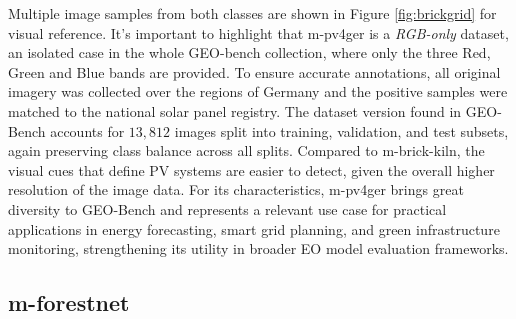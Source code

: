 \documentclass[a4paper, twoside, english]{sapthesis} %
\begin{document}
Multiple image samples from both classes are shown in Figure \ref{fig:brickgrid} for visual reference. It's important to highlight that m-pv4ger is a \emph{RGB-only} dataset, an isolated case in the whole GEO-bench collection, where only the three Red, Green and Blue bands are provided. To ensure accurate annotations, all original imagery was collected over the regions of Germany and the positive samples were matched to the national solar panel registry. The dataset version found in GEO-Bench accounts for $13,812$ images split into training, validation, and test subsets, again preserving class balance across all splits.
Compared to m-brick-kiln, the visual cues that define PV systems are easier to detect, given the overall higher resolution of the image data. For its characteristics, m-pv4ger brings great diversity to GEO-Bench and represents a relevant use case for practical applications in energy forecasting, smart grid planning, and green infrastructure monitoring, strengthening its utility in broader EO model evaluation frameworks.


\subsection{m-forestnet}
\end{document}
